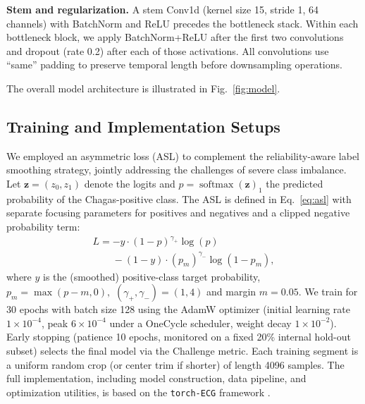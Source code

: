 \textbf{Stem and regularization.} A stem Conv1d (kernel size 15, stride 1, 64 channels) with BatchNorm and ReLU precedes the bottleneck stack. Within each bottleneck block, we apply BatchNorm+ReLU after the first two convolutions and dropout (rate 0.2) after each of those activations. All convolutions use “same” padding to preserve temporal length before downsampling operations.

The overall model architecture is illustrated in Fig.~\ref{fig:model}.


\subsection{Training and Implementation Setups}
\label{subsec:train}


We employed an asymmetric loss (ASL) \cite{ridnik2021asymmetric_loss} to complement the reliability-aware label smoothing strategy, jointly addressing the challenges of severe class imbalance. Let ${\mathbf{z}} = (z_0, z_1)$ denote the logits and $p=\operatorname{softmax}({\mathbf{z}})_1$ the predicted probability of the Chagas-positive class. The ASL is defined in Eq.~\ref{eq:asl} with separate focusing parameters for positives and negatives and a clipped negative probability term:
\begin{equation}
\label{eq:asl}
\begin{multlined}
L = -y \cdot (1-p)^{\gamma_{+}} \log(p) \\
\phantom{L = } - (1-y) \cdot (p_m)^{\gamma_{-}} \log(1-p_m),
\end{multlined}
\end{equation}
where $y$ is the (smoothed) positive-class target probability, $p_m = \max(p - m, 0),$ $(\gamma_{+},\gamma_{-})=(1,4)$ and margin $m=0.05$. We train for 30 epochs with batch size 128 using the AdamW optimizer (initial learning rate $1\times10^{-4}$, peak $6\times10^{-4}$ under a OneCycle scheduler, weight decay $1\times10^{-2}$). Early stopping (patience 10 epochs, monitored on a fixed 20\% internal hold-out subset) selects the final model via the Challenge metric. Each training segment is a uniform random crop (or center trim if shorter) of length 4096 samples. The full implementation, including model construction, data pipeline, and optimization utilities, is based on the \texttt{torch-ECG} framework \cite{torch_ecg_paper}.
